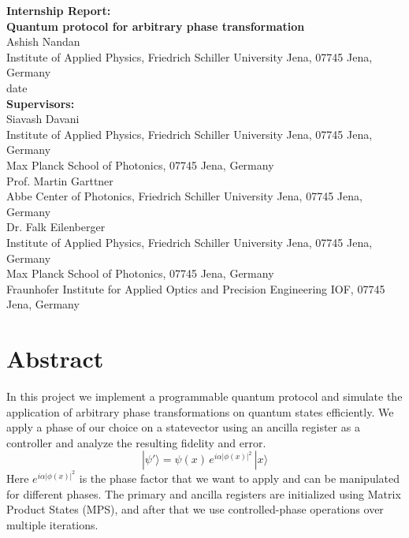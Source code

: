 \documentclass[12pt,a4paper]{article}
\begin{document}
\begin{titlepage}
    \centering
    \vspace*{2cm}

    {\LARGE \textbf{Internship Report:}}\\[1.5cm]

    {\Huge \textbf{Quantum protocol for arbitrary phase transformation}}\\[2cm]

    {\Large Ashish Nandan}\\[0.5cm]
    {\large Institute of Applied Physics, Friedrich Schiller University Jena, 07745 Jena, Germany}\\
    
    {\large date}\\[2cm]

    \textbf{Supervisors:}\\[0.5cm]
    Siavash Davani\\
    Institute of Applied Physics, Friedrich Schiller University Jena, 07745 Jena, Germany\\
    Max Planck School of Photonics, 07745 Jena, Germany\\[0.5cm]
    
    Prof. Martin Garttner\\
    Abbe Center of Photonics, Friedrich Schiller University Jena, 07745 Jena, Germany\\[0.5cm]

    Dr. Falk Eilenberger\\
    Institute of Applied Physics, Friedrich Schiller University Jena, 07745 Jena, Germany\\
    Max Planck School of Photonics, 07745 Jena, Germany\\
    Fraunhofer Institute for Applied Optics and Precision Engineering IOF, 07745 Jena, Germany

    \vfill
\end{titlepage}

\section*{Abstract}
In this project we implement a programmable quantum protocol and simulate the application of arbitrary phase transformations on quantum states efficiently.
We apply a phase of our choice on a statevector using an ancilla register as a controller and analyze the resulting fidelity and error.
\[
|\psi'\rangle = \psi(x) \, e^{i \alpha |\phi(x)|^2} \, |x\rangle
\]
Here $e^{i \alpha |\phi(x)|^2}$ is the phase factor that we want to apply and can be manipulated for different phases. The primary and ancilla registers are initialized using Matrix Product States (MPS), and after that we use controlled-phase operations over multiple iterations.
\end{document}
